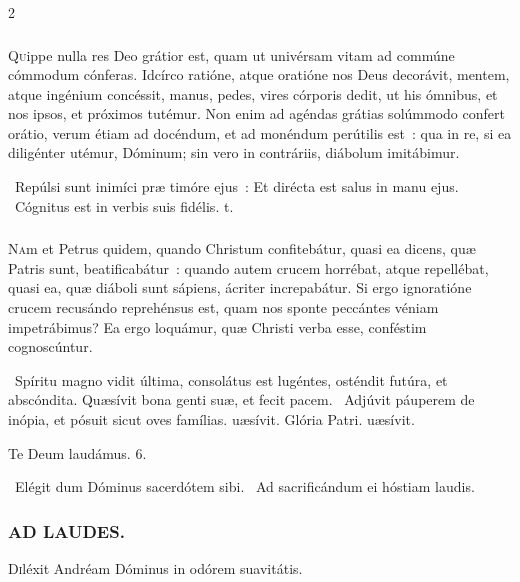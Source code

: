 \documentclass[9pt,twoside]{extarticle}
\begin{document}
\begin{multicols}{2}
{\subsubsection*{\center {}}
\lettrine{Q}uippe nulla res Deo grátior est, quam ut univérsam vitam ad commúne cómmodum cónferas. Idcírco ratióne, atque oratióne nos Deus decorávit, mentem, atque ingénium concéssit, manus, pedes, vires córporis dedit, ut his ómnibus, et nos ipsos, et próximos tutémur. Non enim ad agéndas grátias solúmmodo confert orátio, verum étiam ad docéndum, et ad monéndum perútilis est~: qua in re, si ea diligénter utémur, Dóminum; sin vero in contráriis, diábolum imitábimur.

\begin{tightlist}{}
\item {}~Repúlsi sunt inimíci præ timóre ejus~: \textred{*} Et dirécta est salus in manu ejus. ~Cógnitus est in verbis suis fidélis. t.
\end{tightlist}

\subsubsection*{\center {}}
\lettrine{N}am et Petrus quidem, quando Christum confitebátur, quasi ea dicens, quæ Patris sunt, beatificabátur~: quando autem crucem horrébat, atque repellébat, quasi ea, quæ diáboli sunt sápiens, ácriter increpabátur. Si ergo ignoratióne crucem recusándo reprehénsus est, quam nos sponte peccántes véniam impetrábimus? Ea ergo loquámur, quæ Christi verba esse, conféstim cognoscúntur.

\begin{tightlist}{}
\item {}~Spíritu magno vidit última, consolátus est lugéntes, osténdit futúra, et abscóndita. \textred{*} Quæsívit bona genti suæ, et fecit pacem. ~Adjúvit páuperem de inópia, et pósuit sicut oves famílias. uæsívit. Glória Patri. uæsívit.
\item Te Deum laudámus. 6.
\item {}~Elégit dum Dóminus sacerdótem sibi. ~Ad sacrificándum ei hóstiam laudis.
\end{tightlist}

\subsubsection*{\center \textsc{AD LAUDES.}}
\begin{center} \end{center}
\lettrine{D}iléxit Andréam Dóminus in odórem suavitátis.

}
\end{multicols}
\end{document}
